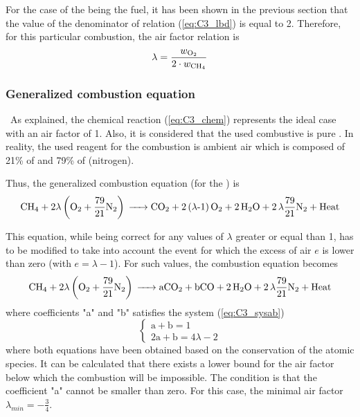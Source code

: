 For the case of the  being the fuel, it has been shown in the previous section that the value of the denominator of relation (\ref{eq:C3_lbd}) is equal to 2. Therefore, for this particular combustion, the air factor relation is 
\begin{equation}
\lambda = \frac{w_{\ce{O2}}}{2\cdot w_{\ce{CH4}}}\label{eq:C3_lbdCH4}
\end{equation}

\subsubsection{Generalized combustion equation}
\quad\, As explained, the chemical reaction (\ref{eq:C3_chem}) represents the ideal case with an air factor of 1. Also, it is considered that the used combustive is pure . In reality, the used reagent for the combustion is ambient air which is composed of 21\% of  and 79\% of  (nitrogen). 

Thus, the generalized combustion equation (for the ) is
\begin{equation}
\ce{CH4 +}2\lambda \left(\ce{O2}+\frac{79}{21}\ce{N2}\right) \ce{-> CO2 + 2(\lambda-1)O2 + 2H2O + 2\lambda\frac{79}{21}N2 + \text{Heat}}\label{eq:C3_chemgeng0}
\end{equation}

This equation, while being correct for any values of $\lambda$ greater or equal than 1, has to be modified to take into account the event for which the excess of air $e$ is lower than zero (with $e=\lambda -1$). For such values, the combustion equation becomes 
\begin{equation}
\ce{CH4 +}2\lambda \left(\ce{O2}+\frac{79}{21}\ce{N2}\right) \ce{-> aCO2 + bCO + 2H2O + 2\lambda\frac{79}{21}N2 + \text{Heat}}\label{eq:C3_chemgeng1}
\end{equation}
where coefficients "a" and "b" satisfies the system (\ref{eq:C3_sysab})
\begin{equation}
\begin{cases}
\text{a} + \text{b} = 1\\
2\text{a} + \text{b} = 4\lambda - 2
\end{cases}\label{eq:C3_sysab}
\end{equation}
where both equations have been obtained based on the conservation of the atomic species. It can be calculated that there exists a lower bound for the air factor below which the combustion will be impossible. The condition is that the coefficient "a" cannot be smaller than zero. For this case, the minimal air factor $\lambda_{min} =-\frac{3}{4}$.

